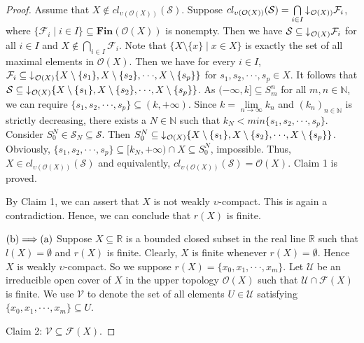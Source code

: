 \documentclass[preprint,12pt]{elsarticle}
\numberwithin{equation}{section}
\newcommand{\dn}{\mathord{\downarrow}\hspace{0.05em}}
\begin{document}
\begin{proof}
Assume that $X\not\in cl_{\upsilon(\mathcal{O}(X))}(\mathcal{S})$. Suppose $cl_{\upsilon(\mathcal{O}(X))}(\mathcal{S})=\bigcap\limits_{i\in I}\dn_{\mathcal{O}(X))}\mathcal{F}_{i}$, where $\{\mathcal{F}_{i}\mid i\in I\}\subseteq\mathbf{Fin}(\mathcal{O}(X))$ is nonempty. Then we have $\mathcal{S}\subseteq\dn_{\mathcal{O}(X)}\mathcal{F}_{i}$ for all $i\in I$ and $X\not\in\bigcap\limits_{i\in I}\mathcal{F}_{i}$. Note that $\{X\setminus\{x\}\mid x\in X\}$ is exactly the set of all maximal elements in $\mathcal{O}(X)$. Then we have for every $i\in I$, $\mathcal{F}_{i}\subseteq\dn_{\mathcal{O}(X)}\{X\setminus\{s_{1}\},X\setminus\{s_{2}\},\cdot\cdot\cdot,X\setminus\{s_{p}\}\}$ for $s_{1},s_{2},\cdot\cdot\cdot,s_{p}\in X$. It follows that $\mathcal{S}\subseteq\dn_{\mathcal{O}(X)}\{X\setminus\{s_{1}\},X\setminus\{s_{2}\},\cdot\cdot\cdot,X\setminus\{s_{p}\}\}$. As $(-\infty,k]\subseteq S^{n}_{m}$ for all $m,n\in\mathbb{N}$, we can require $\{s_{1},s_{2},\cdot\cdot\cdot,s_{p}\}\subseteq(k,+\infty)$. Since $k=\lim\limits_{n\longrightarrow\infty}k_{n}$ and $(k_{n})_{n\in\mathbb{N}}$ is strictly decreasing, there exists a $N\in\mathbb{N}$ such that $k_{N}<min\{s_{1},s_{2},\cdot\cdot\cdot,s_{p}\}$. Consider $S^{N}_{0}\in \mathcal{S}_{N}\subseteq\mathcal{S}$. Then $S^{N}_{0}\subseteq\dn_{\mathcal{O}(X)}\{X\setminus\{s_{1}\},X\setminus\{s_{2}\},\cdot\cdot\cdot,X\setminus\{s_{p}\}\}$. Obviously, $\{s_{1},s_{2},\cdot\cdot\cdot,s_{p}\}\subseteq[k_{N},+\infty)\cap X\subseteq S^{N}_{0}$, impossible. Thus, $X\in cl_{\upsilon(\mathcal{O}(X))}(\mathcal{S})$ and equivalently, $cl_{\upsilon(\mathcal{O}(X))}(\mathcal{S})=\mathcal{O}(X)$. Claim 1 is proved.

By Claim 1, we can assert that $X$ is not weakly $\upsilon$-compact. This is again a contradiction. Hence, we can conclude that $r(X)$ is finite.

${\rm (b)\Longrightarrow(a)}$ Suppose $X\subseteq\mathbb{R}$ is a bounded closed subset in the real line $\mathbb{R}$ such that $l(X)=\emptyset$ and $r(X)$ is finite. Clearly, $X$ is finite whenever $r(X)=\emptyset$. Hence $X$ is weakly $\upsilon$-compact. So we suppose $r(X)=\{x_{0},x_{1},\cdot\cdot\cdot,x_{m}\}$.  Let $\mathcal{U}$ be an irreducible open cover of $X$ in the upper topology $\mathcal{O}(X)$ such that $\mathcal{U}\cap\mathscr{F}(X)$ is finite. We use $\mathcal{V}$ to denote the set of all elements $U\in\mathcal{U}$ satisfying $\{x_{0},x_{1},\cdot\cdot\cdot,x_{m}\}\subseteq U$.

Claim 2: $\mathcal{V}\subseteq\mathscr{F}(X)$.




\end{proof}
\end{document}
